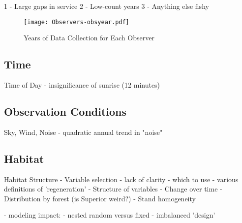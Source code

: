 1 - Large gaps in service
2 - Low-count years
3 - Anything else fishy

\begin{figure}
\texttt{[image: Observers-obsyear.pdf]}
\caption{Years of Data Collection for Each Observer}
\label{fig:Observers-obsyear}
\end{figure}





\subsection{Time}

Time of Day
- insignificance of sunrise (12 minutes)





\subsection{Observation Conditions}

Sky, Wind, Noise
- quadratic annual trend in "noise"





\subsection{Habitat}

Habitat Structure
- Variable selection
  - lack of clarity
    - which to use
    - various definitions of 'regeneration'
- Structure of variables
- Change over time
- Distribution by forest (is Superior weird?)
- Stand homogeneity

- modeling impact:
  - nested random versus fixed
  - imbalanced 'design'